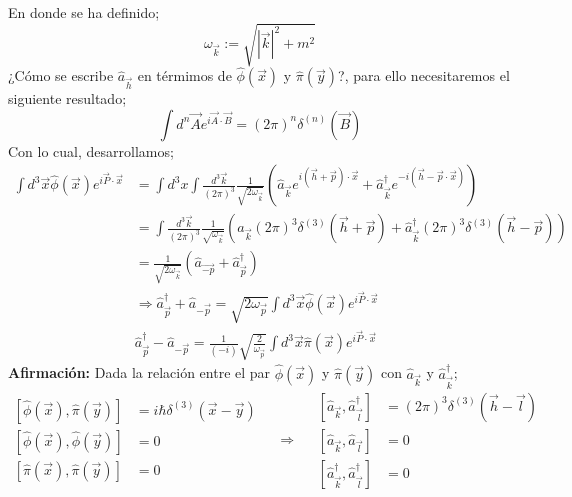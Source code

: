 \documentclass[../main.tex]{subfiles}
\begin{document}
En donde se ha definido;
\begin{equation}
  \omega_{\vec{k}} := \sqrt{|\vec{k}|^2 + m^2}
 \end{equation}
 ¿Cómo se escribe $\hat{a}_{\vec{h}}$ en térmimos de $\hat{\phi}(\vec{x})$ y $\hat{\pi}(\vec{y})$?, para ello necesitaremos el siguiente resultado;
 \begin{equation}
   \int d^{n}\vec{A} e^{i\vec{A}\cdot \vec{B}} = \left( 2\pi \right)^n \delta^{(n)}(\vec{B})
  \end{equation}
  Con lo cual, desarrollamos;
  \begin{align*}
    \int d^3\vec{x} \hat{\phi}(\vec{x}) e^{i\vec{P}\cdot \vec{x}} & = \int d^3 x \int \frac{d^3\vec{k}}{(2\pi)^3} \frac{1}{\sqrt{2\omega_{\vec{k}}}} \left( \hat{a}_{\vec{k}} e^{i (\vec{h}+\vec{p}) \cdot \vec{x} } + \hat{a}^\dagger_{\vec{k}} e^{-i(\vec{h}-\vec{p}\cdot \vec{x})} \right) \\
    & = \int \frac{d^3\vec{k}}{(2\pi)^3} \frac{1}{\sqrt{\omega_{\vec{k}}}} \left( \hat{a}_{\vec{k}} (2\pi)^3 \delta^{(3)}(\vec{h}+\vec{p}) + \hat{a}^\dagger_{\vec{k}}   (2\pi)^3 \delta^{(3)}(\vec{h}-\vec{p})\right) \\
    & = \frac{1}{\sqrt{2\omega_{\vec{k}}}} \left( \hat{a}_{\vec{-p}} + \hat{a}^\dagger_{\vec{p}} \right)\\
    & \Rightarrow \hat{a}_{\vec{p}}^\dagger + \hat{a}_{-\vec{p}} = \sqrt{2\omega_{\vec{p}}} \int d^3\vec{x} \hat{\phi}(\vec{x}) e^{i\vec{P}\cdot\vec{x}} \\
    &  \hat{a}_{\vec{p}}^\dagger - \hat{a}_{-\vec{p}} =\frac{1}{(-i)} \sqrt{\frac{2}{\omega_{\vec{p}}}} \int d^3\vec{x} \hat{\pi}(\vec{x}) e^{i\vec{P}\cdot\vec{x}}
  \end{align*}
\textbf{Afirmación:} Dada la relación entre el par $\hat{\phi}(\vec{x})$ y $\hat{\pi}(\vec{y})$ 
con $\hat{a}_{\vec{k}}$ y $\hat{a}^\dagger_{\vec{k}}$;
\begin{equation}
 \begin{aligned}
  \left[ \hat{\phi}(\vec{x}) , \hat{\pi}(\vec{y}) \right] & = i\hbar \delta^{(3)}(\vec{x}-\vec{y}) \\
  \left[ \hat{\phi}(\vec{x}) , \hat{\phi}(\vec{y}) \right] & = 0 \\
   \left[ \hat{\pi}(\vec{x}) , \hat{\pi}(\vec{y}) \right] & = 0 
\end{aligned} \quad \Rightarrow \quad
\begin{aligned}
  \left[ \hat{a}_{\vec{k}} ,\hat{a}^\dagger_{\vec{l}} \right] & = (2\pi)^3 \delta^{(3)}(\vec{h}-\vec{l}) \\
  \left[ \hat{a}_{\vec{k}} ,\hat{a}_{\vec{l}} \right] & = 0  \\
  \left[ \hat{a}^\dagger_{\vec{k}} ,\hat{a}^\dagger_{\vec{l}} \right] & = 0\end{aligned}
 \end{equation}
\end{document}

